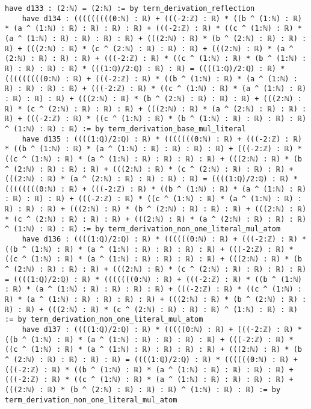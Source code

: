 \documentclass{article}
\begin{document}
\begin{tcolorbox}[colback=white!10, width=\linewidth]
\begin{lstlisting}[language=Lean4]
    have d133 : (2:ℕ) = (2:ℕ) := by term_derivation_reflection
    have d134 : (((((((((0:ℕ) : ℝ) + (((-2:ℤ) : ℝ) * ((b ^ (1:ℕ) : ℝ) * (a ^ (1:ℕ) : ℝ) : ℝ) : ℝ) : ℝ) + (((-2:ℤ) : ℝ) * ((c ^ (1:ℕ) : ℝ) * (a ^ (1:ℕ) : ℝ) : ℝ) : ℝ) : ℝ) + (((2:ℕ) : ℝ) * (b ^ (2:ℕ) : ℝ) : ℝ) : ℝ) + (((2:ℕ) : ℝ) * (c ^ (2:ℕ) : ℝ) : ℝ) : ℝ) + (((2:ℕ) : ℝ) * (a ^ (2:ℕ) : ℝ) : ℝ) : ℝ) + (((-2:ℤ) : ℝ) * ((c ^ (1:ℕ) : ℝ) * (b ^ (1:ℕ) : ℝ) : ℝ) : ℝ) : ℝ) * (((1:ℚ)/2:ℚ) : ℝ) : ℝ) = ((((1:ℚ)/2:ℚ) : ℝ) * (((((((((0:ℕ) : ℝ) + (((-2:ℤ) : ℝ) * ((b ^ (1:ℕ) : ℝ) * (a ^ (1:ℕ) : ℝ) : ℝ) : ℝ) : ℝ) + (((-2:ℤ) : ℝ) * ((c ^ (1:ℕ) : ℝ) * (a ^ (1:ℕ) : ℝ) : ℝ) : ℝ) : ℝ) + (((2:ℕ) : ℝ) * (b ^ (2:ℕ) : ℝ) : ℝ) : ℝ) + (((2:ℕ) : ℝ) * (c ^ (2:ℕ) : ℝ) : ℝ) : ℝ) + (((2:ℕ) : ℝ) * (a ^ (2:ℕ) : ℝ) : ℝ) : ℝ) + (((-2:ℤ) : ℝ) * ((c ^ (1:ℕ) : ℝ) * (b ^ (1:ℕ) : ℝ) : ℝ) : ℝ) : ℝ) ^ (1:ℕ) : ℝ) : ℝ) := by term_derivation_base_mul_literal
    have d135 : ((((1:ℚ)/2:ℚ) : ℝ) * (((((((0:ℕ) : ℝ) + (((-2:ℤ) : ℝ) * ((b ^ (1:ℕ) : ℝ) * (a ^ (1:ℕ) : ℝ) : ℝ) : ℝ) : ℝ) + (((-2:ℤ) : ℝ) * ((c ^ (1:ℕ) : ℝ) * (a ^ (1:ℕ) : ℝ) : ℝ) : ℝ) : ℝ) + (((2:ℕ) : ℝ) * (b ^ (2:ℕ) : ℝ) : ℝ) : ℝ) + (((2:ℕ) : ℝ) * (c ^ (2:ℕ) : ℝ) : ℝ) : ℝ) + (((2:ℕ) : ℝ) * (a ^ (2:ℕ) : ℝ) : ℝ) : ℝ) : ℝ) = ((((1:ℚ)/2:ℚ) : ℝ) * ((((((((0:ℕ) : ℝ) + (((-2:ℤ) : ℝ) * ((b ^ (1:ℕ) : ℝ) * (a ^ (1:ℕ) : ℝ) : ℝ) : ℝ) : ℝ) + (((-2:ℤ) : ℝ) * ((c ^ (1:ℕ) : ℝ) * (a ^ (1:ℕ) : ℝ) : ℝ) : ℝ) : ℝ) + (((2:ℕ) : ℝ) * (b ^ (2:ℕ) : ℝ) : ℝ) : ℝ) + (((2:ℕ) : ℝ) * (c ^ (2:ℕ) : ℝ) : ℝ) : ℝ) + (((2:ℕ) : ℝ) * (a ^ (2:ℕ) : ℝ) : ℝ) : ℝ) ^ (1:ℕ) : ℝ) : ℝ) := by term_derivation_non_one_literal_mul_atom
    have d136 : ((((1:ℚ)/2:ℚ) : ℝ) * ((((((0:ℕ) : ℝ) + (((-2:ℤ) : ℝ) * ((b ^ (1:ℕ) : ℝ) * (a ^ (1:ℕ) : ℝ) : ℝ) : ℝ) : ℝ) + (((-2:ℤ) : ℝ) * ((c ^ (1:ℕ) : ℝ) * (a ^ (1:ℕ) : ℝ) : ℝ) : ℝ) : ℝ) + (((2:ℕ) : ℝ) * (b ^ (2:ℕ) : ℝ) : ℝ) : ℝ) + (((2:ℕ) : ℝ) * (c ^ (2:ℕ) : ℝ) : ℝ) : ℝ) : ℝ) = ((((1:ℚ)/2:ℚ) : ℝ) * (((((((0:ℕ) : ℝ) + (((-2:ℤ) : ℝ) * ((b ^ (1:ℕ) : ℝ) * (a ^ (1:ℕ) : ℝ) : ℝ) : ℝ) : ℝ) + (((-2:ℤ) : ℝ) * ((c ^ (1:ℕ) : ℝ) * (a ^ (1:ℕ) : ℝ) : ℝ) : ℝ) : ℝ) + (((2:ℕ) : ℝ) * (b ^ (2:ℕ) : ℝ) : ℝ) : ℝ) + (((2:ℕ) : ℝ) * (c ^ (2:ℕ) : ℝ) : ℝ) : ℝ) ^ (1:ℕ) : ℝ) : ℝ) := by term_derivation_non_one_literal_mul_atom
    have d137 : ((((1:ℚ)/2:ℚ) : ℝ) * (((((0:ℕ) : ℝ) + (((-2:ℤ) : ℝ) * ((b ^ (1:ℕ) : ℝ) * (a ^ (1:ℕ) : ℝ) : ℝ) : ℝ) : ℝ) + (((-2:ℤ) : ℝ) * ((c ^ (1:ℕ) : ℝ) * (a ^ (1:ℕ) : ℝ) : ℝ) : ℝ) : ℝ) + (((2:ℕ) : ℝ) * (b ^ (2:ℕ) : ℝ) : ℝ) : ℝ) : ℝ) = ((((1:ℚ)/2:ℚ) : ℝ) * ((((((0:ℕ) : ℝ) + (((-2:ℤ) : ℝ) * ((b ^ (1:ℕ) : ℝ) * (a ^ (1:ℕ) : ℝ) : ℝ) : ℝ) : ℝ) + (((-2:ℤ) : ℝ) * ((c ^ (1:ℕ) : ℝ) * (a ^ (1:ℕ) : ℝ) : ℝ) : ℝ) : ℝ) + (((2:ℕ) : ℝ) * (b ^ (2:ℕ) : ℝ) : ℝ) : ℝ) ^ (1:ℕ) : ℝ) : ℝ) := by term_derivation_non_one_literal_mul_atom

\end{lstlisting}
\end{tcolorbox}
\end{document}
